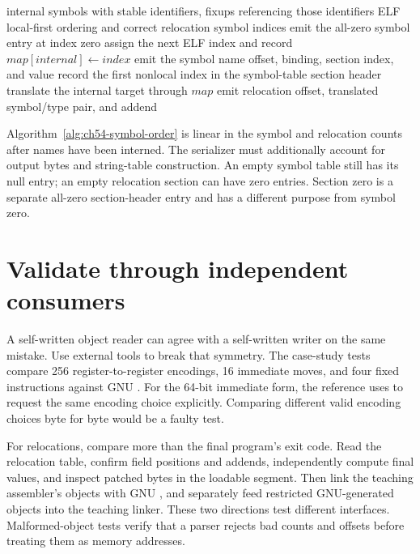 \begin{algorithm}[htbp]
\caption{Serialize symbols without invalidating relocation identities.}
\label{alg:ch54-symbol-order}
\begin{pseudocode}
\Require internal symbols with stable identifiers, fixups referencing those identifiers
\Ensure ELF local-first ordering and correct relocation symbol indices
\State emit the all-zero symbol entry at index zero
  \State assign the next ELF index and record $map[internal]\gets index$
  \State emit the symbol name offset, binding, section index, and value
\EndFor
\State record the first nonlocal index in the symbol-table section header
  \State translate the internal target through $map$
  \State emit relocation offset, translated symbol/type pair, and addend
\EndFor
\end{pseudocode}
\end{algorithm}

Algorithm~\ref{alg:ch54-symbol-order} is linear in the symbol and relocation counts after names have been interned.
The serializer must additionally account for output bytes and string-table construction.
An empty symbol table still has its null entry; an empty relocation section can have zero entries.
Section zero is a separate all-zero section-header entry and has a different purpose from symbol zero.

\section{Validate through independent consumers}
\label{sec:ch54-validation}

A self-written object reader can agree with a self-written writer on the same mistake.
Use external tools to break that symmetry.
The case-study tests compare 256 register-to-register encodings, 16 immediate moves, and four fixed instructions against GNU .
For the 64-bit immediate form, the reference uses  to request the same encoding choice explicitly.
Comparing different valid encoding choices byte for byte would be a faulty test.

For relocations, compare more than the final program's exit code.
Read the relocation table, confirm field positions and addends, independently compute final values, and inspect patched bytes in the loadable segment.
Then link the teaching assembler's objects with GNU , and separately feed restricted GNU-generated objects into the teaching linker.
These two directions test different interfaces.
Malformed-object tests verify that a parser rejects bad counts and offsets before treating them as memory addresses.

